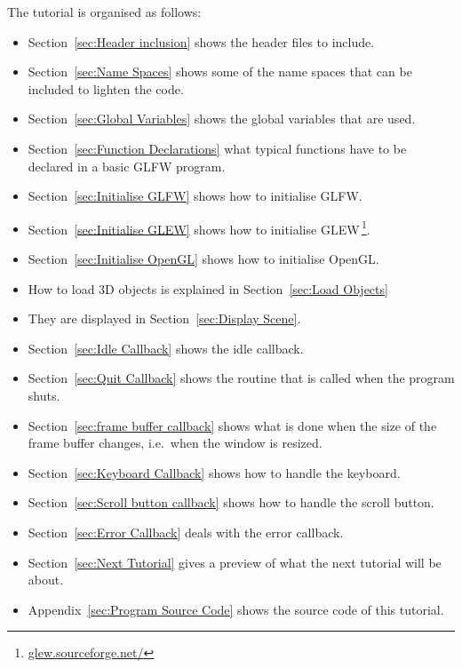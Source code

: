 \documentclass[11pt,oneside,a4paper,final]{article}
\begin{document}
The tutorial is organised as follows:
\begin{itemize}
 \item Section~\ref{sec:Header inclusion} shows the header files to include. 

 \item Section~\ref{sec:Name Spaces} shows some of the name spaces that can be 
	included to lighten the code. 

 \item Section~\ref{sec:Global Variables} shows the global variables that are 
	used. 

 \item Section~\ref{sec:Function Declarations} what typical functions have to 
	be declared in a basic GLFW program. 

 \item Section~\ref{sec:Initialise GLFW} shows how to initialise GLFW. 

 \item Section~\ref{sec:Initialise GLEW} shows how to initialise 
    GLEW\,\footnote{\url{glew.sourceforge.net/}}. 

 \item Section~\ref{sec:Initialise OpenGL} shows how to initialise OpenGL. 

 \item How to load 3D objects is explained in Section~\ref{sec:Load Objects} 

 \item They are displayed in Section~\ref{sec:Display Scene}.

 \item Section~\ref{sec:Idle Callback} shows the idle callback. 

 \item Section~\ref{sec:Quit Callback} shows the routine that is called when 
  the program shuts.

 \item Section~\ref{sec:frame buffer callback} shows what is done when the size 
of the frame buffer changes, i.e.~when the window is resized.

 \item Section~\ref{sec:Keyboard Callback} shows how to handle the keyboard.

 \item Section~\ref{sec:Scroll button callback} shows how to handle the 
  scroll button.
 
 \item Section~\ref{sec:Error Callback} deals with the error callback. 
 
 \item Section~\ref{sec:Next Tutorial} gives a preview of what the next 
  tutorial will be about.
 
 \item Appendix~\ref{sec:Program Source Code} shows the source code of this 
	tutorial. 
	
\end{itemize}
\end{document}
